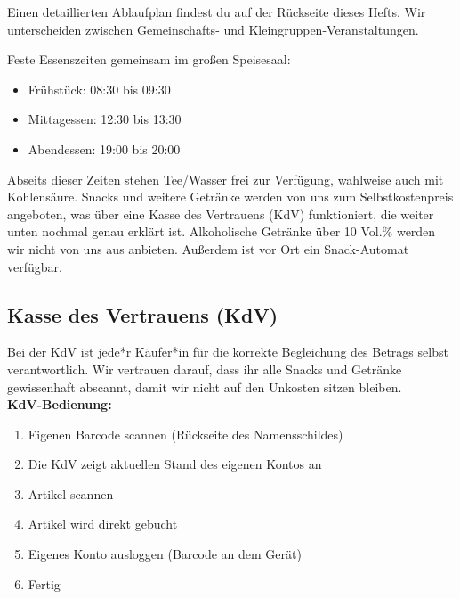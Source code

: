 \documentclass[a5paper,pagesize,twoside,fontsize=8pt,DIV=15]{scrreprt}
\begin{document}







Einen detaillierten Ablaufplan findest du auf der Rückseite dieses Hefts. Wir unterscheiden zwischen Gemeinschafts- und Kleingruppen-Veranstaltungen.

\vspace{-2mm}

Feste Essenszeiten gemeinsam im großen Speisesaal:
\begin{itemize}
\item Frühstück: 08:30 bis 09:30
\item Mittagessen: 12:30 bis 13:30
\item Abendessen: 19:00 bis 20:00
\end{itemize}


Abseits dieser Zeiten stehen Tee/Wasser frei zur Verfügung, wahlweise auch mit Kohlensäure. Snacks und weitere Getränke werden von uns zum Selbstkostenpreis angeboten, was über eine Kasse des Vertrauens (KdV) funktioniert, die weiter unten nochmal genau erklärt ist. Alkoholische Getränke über 10 Vol.\% werden wir nicht von uns aus anbieten. Außerdem ist vor Ort ein Snack-Automat verfügbar.


\subsection*{Kasse des Vertrauens (KdV)}

Bei der KdV ist jede*r Käufer*in für die korrekte Begleichung des Betrags selbst verantwortlich. Wir vertrauen darauf, dass ihr alle Snacks und Getränke gewissenhaft abscannt, damit wir nicht auf den Unkosten sitzen bleiben.\\

\textbf{KdV-Bedienung:}
\begin{enumerate}
    \item Eigenen Barcode scannen (Rückseite des Namensschildes)
    \item Die KdV zeigt aktuellen Stand des eigenen Kontos an
    \item Artikel scannen
    \item Artikel wird direkt gebucht 
    \item Eigenes Konto ausloggen (Barcode an dem Gerät)
    \item Fertig
\end{enumerate}
\end{document}
